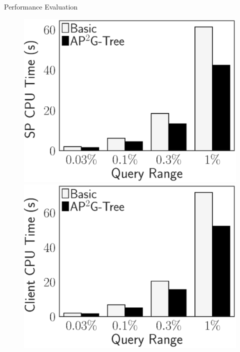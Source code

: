 \documentclass[xcolor={dvipsnames},aspectratio=169,10pt]{beamer}
\begin{document}
\begin{frame}{Performance Evaluation}
  \begin{figure}
    \centering
    \includegraphics[height=\ht\figbox]{exp-figs/access-control/range_sp.eps}\quad%
    \includegraphics[height=\ht\figbox]{exp-figs/access-control/range_user.eps}\quad%

\end{figure}
\end{frame}
\end{document}
